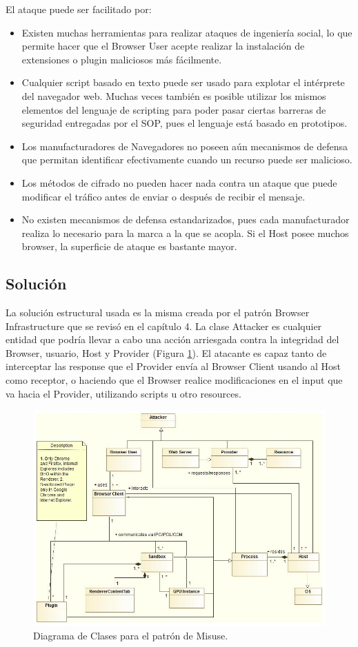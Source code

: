 El ataque puede ser facilitado por:
\begin{itemize}
	\item Existen muchas herramientas para realizar ataques de ingeniería social, lo que permite hacer que el Browser User acepte realizar la instalación de extensiones o plugin maliciosos más fácilmente.
	\item Cualquier script basado en texto puede ser usado para explotar el intérprete del navegador web. Muchas veces también es posible utilizar los mismos elementos del lenguaje de scripting para poder pasar ciertas barreras de seguridad entregadas por el SOP, pues el lenguaje está basado en prototipos. 
	\item Los manufacturadores de Navegadores no poseen aún mecanismos de defensa que permitan identificar efectivamente cuando un recurso puede ser malicioso.
	\item Los métodos de cifrado no pueden hacer nada contra un ataque que puede modificar el tráfico antes de enviar o después de recibir el mensaje.
	\item No existen mecanismos de defensa estandarizados, pues cada manufacturador realiza lo necesario para la marca a la que se acopla. Si el Host posee muchos browser, la superficie de ataque es bastante mayor.
\end{itemize}
\subsection{Solución}
La solución estructural usada es la misma creada por el patrón Browser Infrastructure que se revisó en el capítulo 4. La clase Attacker es cualquier entidad que podría llevar a cabo una acción arriesgada contra la integridad del Browser, usuario, Host y Provider (Figura \ref{fig:BIMisuse}). El atacante es capaz tanto de interceptar las response que el Provider envía al Browser Client usando al Host como receptor, o haciendo que el Browser realice modificaciones en el input que va hacia el Provider, utilizando scripts u otro resources.
\begin{figure}[h!t]
	        \centering
	        \includegraphics[scale=0.5]{figures/chap5/patronMisuse.jpg}
	        \caption{Diagrama de Clases para el patrón de Misuse.}
	        \label{fig:BIMisuse}
    \end{figure}

